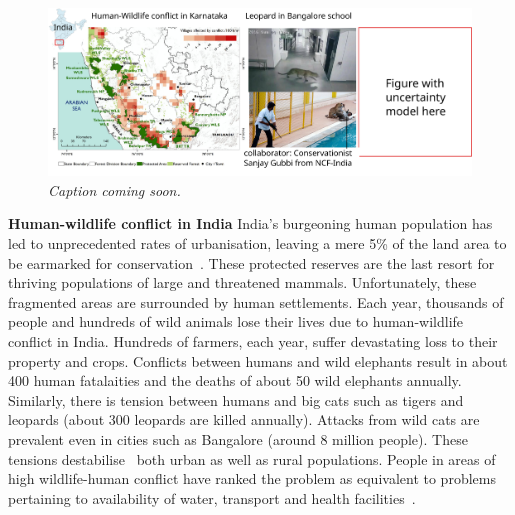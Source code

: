 \documentclass[a4paper,10pt,twocolumn]{article}
\newcommand{\hdg}[1] {\noindent \textbf{#1} }
\begin{document}
{ 
\Large 
{}%
}

\begin{figure}[htbp!]
 \includegraphics[width=\linewidth]{teaser}
\caption{\emph{Caption coming soon.}}
\label{fig:teaser}
\end{figure}

\hdg{Human-wildlife conflict in India} India's burgeoning human population has led to unprecedented rates of urbanisation, leaving a mere 5\% of the land area to be earmarked for conservation~\cite{indiacons}. These protected reserves are the last resort for thriving populations of large and threatened mammals. Unfortunately, these fragmented areas are surrounded by human settlements. Each year, thousands of people and hundreds of wild animals lose their lives due to human-wildlife conflict in India. Hundreds of farmers, each year, suffer devastating loss to their property and crops. Conflicts between humans and wild elephants result in about 400 human fatalaities and the deaths of about 50 wild elephants annually. Similarly, there is tension between humans and big cats such as tigers and leopards (about 300 leopards are killed annually). Attacks from wild cats are prevalent even in cities such as Bangalore (around 8 million people). These tensions destabilise~\cite{barua2013hidden} both urban as well as rural populations. People in areas of high wildlife-human conflict have ranked the problem as equivalent to problems pertaining to availability of water, transport and health facilities~\cite{owen2013conservation}.
\end{document}
